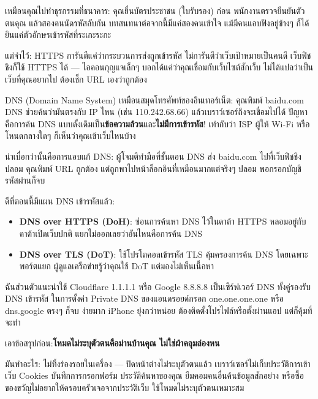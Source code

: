 เหมือนคุณไปทำธุรกรรมที่ธนาคาร: คุณยื่นบัตรประชาชน (ใบรับรอง) ก่อน พนักงานตรวจยืนยันตัวตนคุณ แล้วสองคนนัดรหัสลับกัน บทสนทนาต่อจากนี้มีแค่สองคนเข้าใจ แม้มีคนแอบฟังอยู่ข้างๆ ก็ได้ยินแค่ตัวอักษรเข้ารหัสที่ระเกะระกะ

แต่จำไว้: HTTPS การันตีแค่ว่ากระบวนการส่งถูกเข้ารหัส ไม่การันตีว่าเว็บเป้าหมายเป็นคนดี เว็บฟิชชิงก็ใช้ HTTPS ได้ — ไอคอนกุญแจเล็กๆ บอกได้แค่ว่าคุณเชื่อมกับเว็บไซต์สักเว็บ ไม่ได้แปลว่าเป็นเว็บที่คุณอยากไป ต้องเช็ก URL เองว่าถูกต้อง


DNS (Domain Name System) เหมือนสมุดโทรศัพท์ของอินเทอร์เน็ต: คุณพิมพ์ baidu.com DNS ช่วยค้นว่ามันตรงกับ IP ไหน (เช่น 110.242.68.66) แล้วเบราว์เซอร์ถึงจะเชื่อมไปได้ ปัญหาคือการค้น DNS แบบดั้งเดิมเป็น\textbf{ข้อความล้วน}และ\textbf{ไม่มีการเข้ารหัส}! เท่ากับว่า ISP ผู้ให้ Wi-Fi หรือโหนดกลางใดๆ ก็เห็นว่าคุณเข้าเว็บไหนบ้าง

น่าเบื่อกว่านั้นคือการแอบแก้ DNS: ผู้โจมตีทำมือที่ขั้นตอน DNS ส่ง baidu.com ไปที่เว็บฟิชชิงปลอม คุณพิมพ์ URL ถูกต้อง แต่ถูกพาไปหน้าล็อกอินที่เหมือนมากแต่จริงๆ ปลอม พอกรอกบัญชีรหัสผ่านก็จบ

ดีที่ตอนนี้มีแผน DNS เข้ารหัสแล้ว:

\begin{itemize}
  \item \textbf{DNS over HTTPS (DoH)}: ซ่อนการค้นหา DNS ไว้ในดาต้า HTTPS หลอมอยู่กับดาต้าเปิดเว็บปกติ แยกไม่ออกเลยว่าอันไหนคือการค้น DNS
  \item \textbf{DNS over TLS (DoT)}: ใช้โปรโตคอลเข้ารหัส TLS คุ้มครองการค้น DNS โดยเฉพาะ พอร์ตแยก ผู้ดูแลเครือข่ายรู้ว่าคุณใช้ DoT แต่มองไม่เห็นเนื้อหา
\end{itemize}

ฉันส่วนตัวแนะนำใช้ Cloudflare 1.1.1.1 หรือ Google 8.8.8.8 เป็นเซิร์ฟเวอร์ DNS ทั้งคู่รองรับ DNS เข้ารหัส ในการตั้งค่า Private DNS ของแอนดรอยด์กรอก one.one.one.one หรือ dns.google ตรงๆ ก็จบ ง่ายมาก iPhone ยุ่งกว่าหน่อย ต้องติดตั้งโปรไฟล์หรือตั้งผ่านแอป แต่ก็คุ้มที่จะทำ


เอาข้อสรุปก่อน:\textbf{โหมดไม่ระบุตัวตนคือม่านบ้านคุณ ไม่ใช่ผ้าคลุมล่องหน}

มันทำอะไร: ไม่ทิ้งร่องรอยในเครื่อง — ปิดหน้าต่างไม่ระบุตัวตนแล้ว เบราว์เซอร์ไม่เก็บประวัติการเข้าเว็บ Cookies บันทึกการกรอกฟอร์ม ประวัติค้นหาของคุณ ยืมคอมคนอื่นค้นข้อมูลสักอย่าง หรือซื้อของขวัญไม่อยากให้ครอบครัวเจอจากประวัติเว็บ ใช้โหมดไม่ระบุตัวตนเหมาะสม


